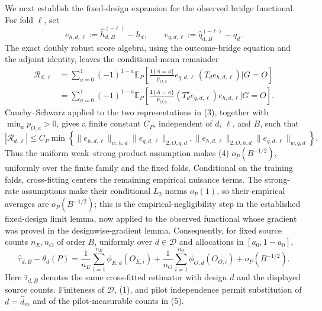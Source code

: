 We next establish the fixed-design expansion for the observed bridge functional.  For fold \(\ell\), set
\[
 e_{h,d,\ell}:=\widehat h_{d,B}^{(-\ell)}-h_d,
 \qquad
 e_{q,d,\ell}:=\widehat q_{d,B}^{(-\ell)}-q_d.
\]
The exact doubly robust score algebra, using the outcome-bridge equation and the adjoint identity, leaves the conditional-mean remainder
\[
\begin{aligned}
 \mathcal R_{d,\ell}
 &=\sum_{a=0}^1(-1)^{1-a}
 \mathbb E_P\!\left[
 \frac{\mathbf 1\{A=a\}}{p_{O,a}}
 e_{q,d,\ell}\,(T_d e_{h,d,\ell})\mathrel{\Big|}G=O\right]\\
 &=\sum_{a=0}^1(-1)^{1-a}
 \mathbb E_P\!\left[
 \frac{\mathbf 1\{A=a\}}{p_{O,a}}
 (T_d^\star e_{q,d,\ell})e_{h,d,\ell}\mathrel{\Big|}G=O\right].
\end{aligned}                                                               \tag{3}
\]
Cauchy--Schwarz applied to the two representations in (3), together with \(\min_a p_{O,a}>0\), gives a finite constant \(C_P\), independent of \(d\), \(\ell\), and \(B\), such that
\[
 |\mathcal R_{d,\ell}|
 \le C_P
 \min\left\{
 \|e_{h,d,\ell}\|_{w,h,d}\|e_{q,d,\ell}\|_{2,O,q,d},
 \|e_{h,d,\ell}\|_{2,O,h,d}\|e_{q,d,\ell}\|_{w,q,d}
 \right\}.                                                                \tag{4}
\]
Thus the uniform weak--strong product assumption makes (4) \(o_P(B^{-1/2})\), uniformly over the finite family and the fixed folds.  Conditional on the training folds, cross-fitting centers the remaining empirical nuisance terms.  The strong-rate assumptions make their conditional \(L_2\) norms \(o_P(1)\), so their empirical averages are \(o_P(B^{-1/2})\); this is the empirical-negligibility step in the established fixed-design limit lemma, now applied to the observed functional whose gradient was proved in the designwise-gradient lemma.  Consequently, for fixed source counts \(n_E,n_O\) of order \(B\), uniformly over \(d\in\mathcal D\) and allocations in \([a_0,1-a_0]\),
\[
 \widehat\tau_{d,B}-\theta_d(P)
 =\frac1{n_E}\sum_{i=1}^{n_E}\phi_{E,d}(O_{E,i})
  +\frac1{n_O}\sum_{i=1}^{n_O}\phi_{O,d}(O_{O,i})
  +o_P(B^{-1/2}).                                                           \tag{5}
\]
Here \(\widehat\tau_{d,B}\) denotes the same cross-fitted estimator with design \(d\) and the displayed source counts.  Finiteness of \(\mathcal D\), (1), and pilot independence permit substitution of \(d=\widehat d_m\) and of the pilot-measurable counts in (5).

